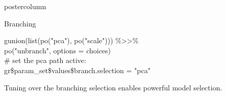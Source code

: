 \documentclass{beamer}
\newlength{\columnheight} %
\newcommand{\codeinline}[1]{\begin{codeboxinline}#1\end{codeboxinline}}
\begin{document}
\begin{frame}[fragile]{}
\begin{columns}
\begin{column}{.245\textwidth}
\begin{beamercolorbox}[center]{postercolumn}
\begin{minipage}{.98\textwidth}
{\begin{myblock}{Branching}
\begin{codeboxexample}
{                  \hspace*{1ex} gunion(list(po("pca"), po("scale"))) \%>{}>\%\\
                  \hspace*{1ex} po("unbranch", options = choices)\\
                  \# set the pca path active:\\
                  gr\$param\_set\$values\$branch.selection = "pca"}
					      \end{codeboxexample}
            Tuning over the branching selection enables powerful model selection.
            \end{myblock}
              \vspace{-1.0em}
            \vfill}
         \end{minipage}
	    \end{beamercolorbox}
		\end{column}
 \end{columns}
\end{frame}
\end{document}
